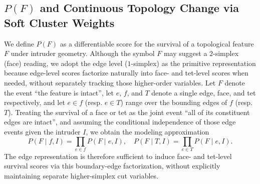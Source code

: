 
\subsection{$P(F)$ and Continuous Topology Change via Soft Cluster Weights}
\label{sec:pf-cutting}

We define $P(F)$ as a differentiable score for the survival of a
topological feature $F$ under intruder geometry. Although the symbol
$F$ may suggest a $2$-simplex (face) reading, we adopt the edge level
($1$-simplex) as the primitive representation because edge-level
scores factorize naturally into face- and tet-level scores when
needed, without separately tracking those higher-order variables. Let
$F$ denote the event ``the feature is intact'', let $e$, $f$, and $T$
denote a single edge, face, and tet respectively, and let $e \in f$
(resp. $e \in T$) range over the bounding edges of $f$ (resp. $T$).
Treating the survival of a face or tet as the joint event ``all of
its constituent edges are intact'', and assuming the conditional
independence of those edge events given the intruder $I$, we obtain
the modeling approximation
\begin{equation}
  P(F \mid f, I) \!=\! \prod_{e \in f}\!P(F \mid e, I),
  \quad
  P(F \mid T, I) \!=\! \prod_{e \in T}\!P(F \mid e, I).
  \label{eq:simplicial-product}
\end{equation}
The edge representation is therefore sufficient to induce face- and
tet-level survival scores via this boundary-edge factorization,
without explicitly maintaining separate higher-simplex cut variables.

